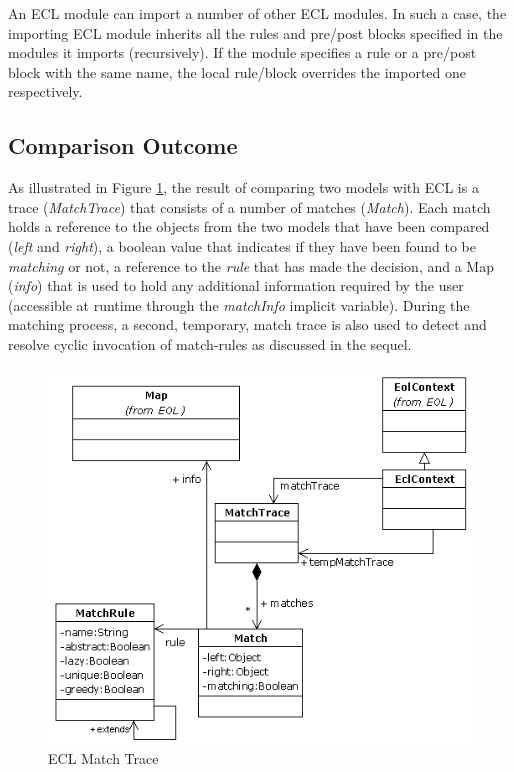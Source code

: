 An ECL module can import a number of other ECL modules. In such a case, the importing ECL module inherits all the rules and pre/post blocks specified in the modules it imports (recursively). If the module specifies a rule or a pre/post block with the same name, the local rule/block overrides the imported one respectively.

\subsection{Comparison Outcome}

As illustrated in Figure \ref{fig:ECLRuntime}, the result of comparing two models with ECL is a trace (\emph{MatchTrace}) that consists of a number of matches (\emph{Match}). Each match holds a reference to the objects from the two models that have been compared (\emph{left} and \emph{right}), a boolean value that indicates if they have been found to be \emph{matching} or not, a reference to the \emph{rule} that has made the decision, and a Map (\emph{info}) that is used to hold any additional information required by the user (accessible at runtime through the \emph{matchInfo} implicit variable). During the matching process, a second, temporary, match trace is also used to detect and resolve cyclic invocation of match-rules as discussed in the sequel.

\begin{figure}
	\centering
		\includegraphics{images/ECLRuntime.png}
	\caption{ECL Match Trace}
	\label{fig:ECLRuntime}
\end{figure}

